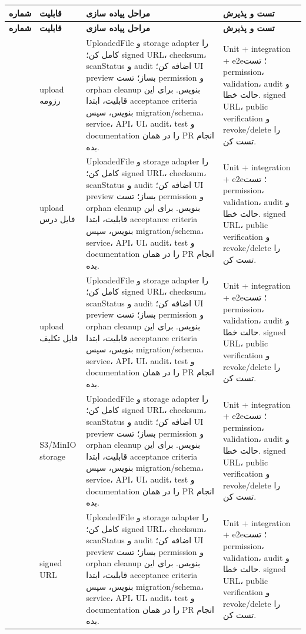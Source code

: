 \documentclass[11pt,a4paper]{article}
\begin{document}
\begin{longtable}{|>{\raggedleft\arraybackslash}p{}|>{\raggedleft\arraybackslash}p{}|>{\raggedleft\arraybackslash}p{}|>{\raggedleft\arraybackslash}p{}|}
\hline
\textbf{شماره} & \textbf{قابلیت} & \textbf{مراحل پیاده سازی} & \textbf{تست و پذیرش} \\\hline
\endfirsthead
\hline
\textbf{شماره} & \textbf{قابلیت} & \textbf{مراحل پیاده سازی} & \textbf{تست و پذیرش} \\\hline
\endhead
221 & upload رزومه & UploadedFile و storage adapter را کامل کن؛ signed URL، checksum، scanStatus و audit اضافه کن؛ UI preview بساز؛ تست permission و orphan cleanup بنویس. برای این قابلیت، ابتدا acceptance criteria بنویس، سپس migration/schema، service، API، UI، audit، test و documentation را در همان PR انجام بده. & Unit + integration + e2e؛ تست permission، validation، audit و حالت خطا. signed URL، public verification و revoke/delete را تست کن. \\ \hline
222 & upload فایل درس & UploadedFile و storage adapter را کامل کن؛ signed URL، checksum، scanStatus و audit اضافه کن؛ UI preview بساز؛ تست permission و orphan cleanup بنویس. برای این قابلیت، ابتدا acceptance criteria بنویس، سپس migration/schema، service، API، UI، audit، test و documentation را در همان PR انجام بده. & Unit + integration + e2e؛ تست permission، validation، audit و حالت خطا. signed URL، public verification و revoke/delete را تست کن. \\ \hline
223 & upload فایل تکلیف & UploadedFile و storage adapter را کامل کن؛ signed URL، checksum، scanStatus و audit اضافه کن؛ UI preview بساز؛ تست permission و orphan cleanup بنویس. برای این قابلیت، ابتدا acceptance criteria بنویس، سپس migration/schema، service، API، UI، audit، test و documentation را در همان PR انجام بده. & Unit + integration + e2e؛ تست permission، validation، audit و حالت خطا. signed URL، public verification و revoke/delete را تست کن. \\ \hline
224 & S3/MinIO storage & UploadedFile و storage adapter را کامل کن؛ signed URL، checksum، scanStatus و audit اضافه کن؛ UI preview بساز؛ تست permission و orphan cleanup بنویس. برای این قابلیت، ابتدا acceptance criteria بنویس، سپس migration/schema، service، API، UI، audit، test و documentation را در همان PR انجام بده. & Unit + integration + e2e؛ تست permission، validation، audit و حالت خطا. signed URL، public verification و revoke/delete را تست کن. \\ \hline
225 & signed URL & UploadedFile و storage adapter را کامل کن؛ signed URL، checksum، scanStatus و audit اضافه کن؛ UI preview بساز؛ تست permission و orphan cleanup بنویس. برای این قابلیت، ابتدا acceptance criteria بنویس، سپس migration/schema، service، API، UI، audit، test و documentation را در همان PR انجام بده. & Unit + integration + e2e؛ تست permission، validation، audit و حالت خطا. signed URL، public verification و revoke/delete را تست کن. \\ \hline

\end{longtable}
\end{document}
